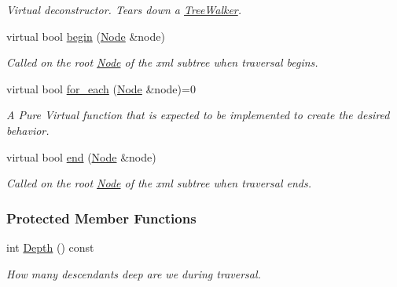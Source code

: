 \begin{DoxyCompactItemize}
\begin{DoxyCompactList}\small\item\em Virtual deconstructor. Tears down a \hyperlink{classphys_1_1xml_1_1TreeWalker}{TreeWalker}. \item\end{DoxyCompactList}\item 
virtual bool \hyperlink{classphys_1_1xml_1_1TreeWalker_a649d9e5a06542be0282d3d20994a62fc}{begin} (\hyperlink{classphys_1_1xml_1_1Node}{Node} \&node)
\begin{DoxyCompactList}\small\item\em Called on the root \hyperlink{classphys_1_1xml_1_1Node}{Node} of the xml subtree when traversal begins. \item\end{DoxyCompactList}\item 
virtual bool \hyperlink{classphys_1_1xml_1_1TreeWalker_a03267e73acac44809f16739fd00a536d}{for\_\-each} (\hyperlink{classphys_1_1xml_1_1Node}{Node} \&node)=0
\begin{DoxyCompactList}\small\item\em A Pure Virtual function that is expected to be implemented to create the desired behavior. \item\end{DoxyCompactList}\item 
virtual bool \hyperlink{classphys_1_1xml_1_1TreeWalker_a210f6d60579a152f89e651be797885b9}{end} (\hyperlink{classphys_1_1xml_1_1Node}{Node} \&node)
\begin{DoxyCompactList}\small\item\em Called on the root \hyperlink{classphys_1_1xml_1_1Node}{Node} of the xml subtree when traversal ends. \item\end{DoxyCompactList}\end{DoxyCompactItemize}
\subsubsection*{Protected Member Functions}
\begin{DoxyCompactItemize}
\item 
int \hyperlink{classphys_1_1xml_1_1TreeWalker_a90fdd705ae4d5e8e3b931bb8896e4397}{Depth} () const 
\begin{DoxyCompactList}\small\item\em How many descendants deep are we during traversal. \item\end{DoxyCompactList}\end{DoxyCompactItemize}
